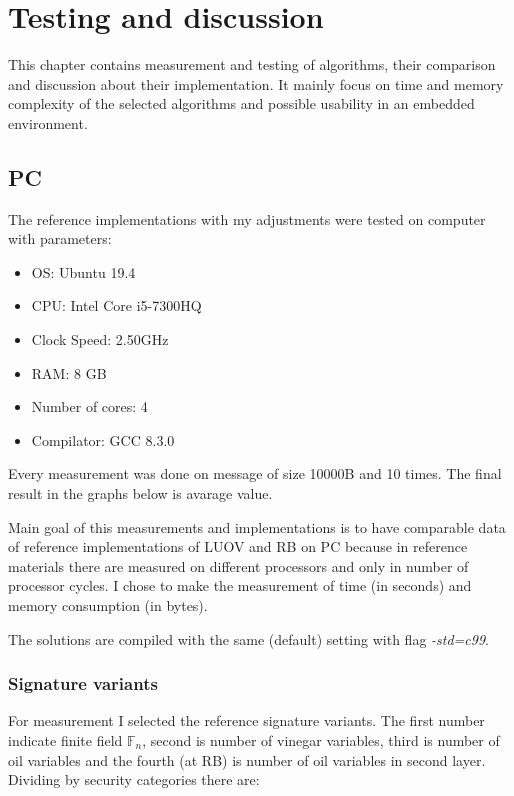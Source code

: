 \documentclass[thesis=M,english]{FITthesis}[2019/12/23]
\begin{document}
\chapter{Testing and discussion} \label{test-and-disk}
This chapter contains measurement and testing of algorithms, their comparison and discussion about their implementation. It mainly focus on time and memory complexity of the selected algorithms and possible usability in an embedded environment.

\section{PC}
The reference implementations with my adjustments were tested on computer with parameters:
\begin{itemize}
\item OS: Ubuntu 19.4
\item CPU: Intel Core i5-7300HQ
\item Clock Speed: 2.50GHz
\item RAM: 8 GB
\item Number of cores: 4
\item Compilator: GCC 8.3.0
\end{itemize}

\bigskip
\noindent
Every measurement was done on message of size 10000B and 10 times. The final result in the graphs below is avarage value.

\bigskip
\noindent
Main goal of this measurements and implementations is to have comparable data of reference implementations of LUOV and RB on PC because in reference materials there are measured on different processors and only in number of processor cycles. I chose to make the measurement of time (in seconds) and memory consumption (in bytes).

\bigskip
\noindent
The solutions are compiled with the same (default) setting with flag \textit{-std=c99}.

\subsection{Signature variants}
For measurement I selected the reference signature variants. The first number indicate finite field $\mathbb{F}_{n}$, second is number of vinegar variables, third is number of oil variables and the fourth (at RB) is number of oil variables in second layer. Dividing by security categories there are:
\end{document}
